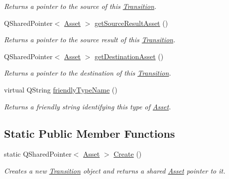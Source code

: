 \begin{DoxyCompactItemize}
\begin{DoxyCompactList}\small\item\em Returns a pointer to the source of this \hyperlink{class_picto_1_1_transition}{Transition}. \end{DoxyCompactList}\item 
\hypertarget{class_picto_1_1_transition_a609b424d8b130ceb9213c3f3fa3a1fa2}{Q\-Shared\-Pointer$<$ \hyperlink{class_picto_1_1_asset}{Asset} $>$ \hyperlink{class_picto_1_1_transition_a609b424d8b130ceb9213c3f3fa3a1fa2}{get\-Source\-Result\-Asset} ()}\label{class_picto_1_1_transition_a609b424d8b130ceb9213c3f3fa3a1fa2}

\begin{DoxyCompactList}\small\item\em Returns a pointer to the source result of this \hyperlink{class_picto_1_1_transition}{Transition}. \end{DoxyCompactList}\item 
\hypertarget{class_picto_1_1_transition_ab3cad7b9d3928cf03d8356f6934ba962}{Q\-Shared\-Pointer$<$ \hyperlink{class_picto_1_1_asset}{Asset} $>$ \hyperlink{class_picto_1_1_transition_ab3cad7b9d3928cf03d8356f6934ba962}{get\-Destination\-Asset} ()}\label{class_picto_1_1_transition_ab3cad7b9d3928cf03d8356f6934ba962}

\begin{DoxyCompactList}\small\item\em Returns a pointer to the destination of this \hyperlink{class_picto_1_1_transition}{Transition}. \end{DoxyCompactList}\item 
virtual Q\-String \hyperlink{class_picto_1_1_transition_a186f341ac2591346ca6a343ecc61c920}{friendly\-Type\-Name} ()
\begin{DoxyCompactList}\small\item\em Returns a friendly string identifying this type of \hyperlink{class_picto_1_1_asset}{Asset}. \end{DoxyCompactList}\end{DoxyCompactItemize}
\subsection*{Static Public Member Functions}
\begin{DoxyCompactItemize}
\item 
\hypertarget{class_picto_1_1_transition_a030172221d1354fb7e8264af1a6f3080}{static Q\-Shared\-Pointer$<$ \hyperlink{class_picto_1_1_asset}{Asset} $>$ \hyperlink{class_picto_1_1_transition_a030172221d1354fb7e8264af1a6f3080}{Create} ()}\label{class_picto_1_1_transition_a030172221d1354fb7e8264af1a6f3080}

\begin{DoxyCompactList}\small\item\em Creates a new \hyperlink{class_picto_1_1_transition}{Transition} object and returns a shared \hyperlink{class_picto_1_1_asset}{Asset} pointer to it. \end{DoxyCompactList}\end{DoxyCompactItemize}

